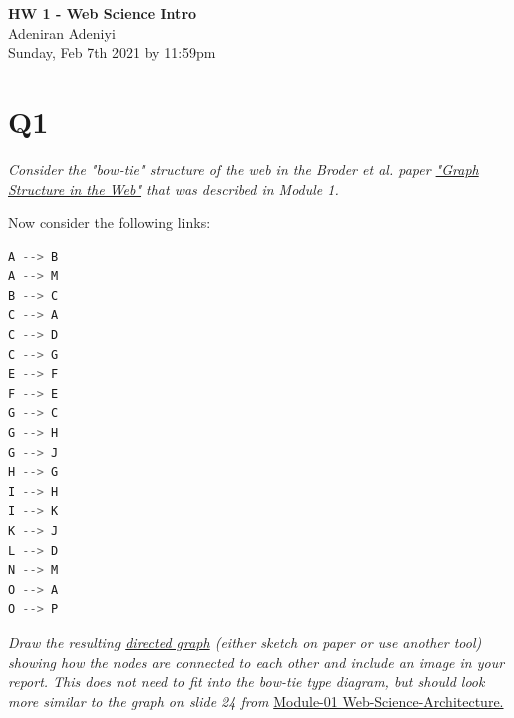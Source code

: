 \documentclass[12pt]{article}
\begin{document}
\begin{centering}
{\large\textbf{HW 1 - Web Science Intro}}\\ %
Adeniran Adeniyi\\                     %
Sunday, Feb 7th 2021  by 11:59pm\\                      %
\end{centering}



\section*{Q1}
\emph{Consider the "bow-tie" structure of the web in the Broder et al. paper \href{http://snap.stanford.edu/class/cs224w-readings/broder00bowtie.pdf}{"Graph Structure in the Web"} that was described in Module 1.} 

Now consider the following links:
\begin{lstlisting}[language= Python]
A --> B
A --> M
B --> C
C --> A
C --> D
C --> G
E --> F
F --> E
G --> C
G --> H
G --> J
H --> G
I --> H
I --> K
K --> J
L --> D
N --> M
O --> A
O --> P
\end{lstlisting}
\emph{ Draw the resulting 
\href{https://en.wikipedia.org/wiki/Directed_graph}{directed graph} (either sketch on paper or use another tool) showing how the nodes are connected to each other and include an image in your report. This does not need to fit into the bow-tie type diagram, but should look more similar to the graph on slide 24 from}
\href{https://docs.google.com/presentation/d/178GkNtFAPB5fzs1D-wdCnlOdbcTyhpAIz_wKxVUaHVk/edit#slide=id.ga9773ac230_0_799}{ Module-01 Web-Science-Architecture.} 
\end{document}
